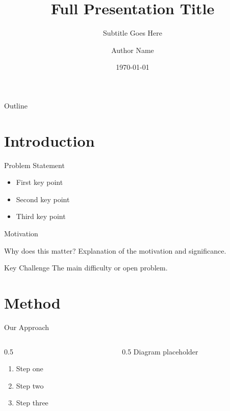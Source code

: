 \documentclass[aspectratio=169, 11pt]{beamer}
\title[Short Title]{Full Presentation Title}
\subtitle{Subtitle Goes Here}
\author[A. Author]{Author Name}
\institute[INST]{Institute / University}
\date{\today}
\begin{document}
\begin{frame}
    \titlepage
\end{frame}

\begin{frame}{Outline}
    \tableofcontents
\end{frame}

\section{Introduction}

\begin{frame}{Problem Statement}
    \begin{itemize}
        \item First key point
        \item Second key point
        \item Third key point
    \end{itemize}
\end{frame}

\begin{frame}{Motivation}
    \begin{block}{Why does this matter?}
        Explanation of the motivation and significance.
    \end{block}
    \begin{alertblock}{Key Challenge}
        The main difficulty or open problem.
    \end{alertblock}
\end{frame}

\section{Method}

\begin{frame}{Our Approach}
    \begin{columns}[T]
        \begin{column}{0.5\textwidth}
            \begin{enumerate}
                \item Step one
                \item Step two
                \item Step three
            \end{enumerate}
        \end{column}
        \begin{column}{0.5\textwidth}
            \centering Diagram placeholder
        \end{column}
    \end{columns}
\end{frame}
\end{document}
